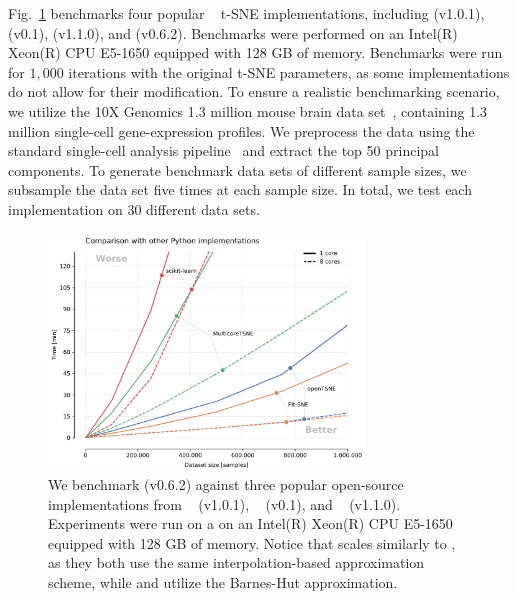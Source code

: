 \documentclass[article]{jss}
\newcommand{\opentsne}{\pkg{openTSNE}\xspace}
\begin{document}
Fig.~\ref{fig:benchmarks_py} benchmarks four popular ~\citep{vanrossum1995python} t-SNE implementations, including  (v1.0.1),  (v0.1),  (v1.1.0), and \opentsne (v0.6.2). Benchmarks were performed on an Intel(R) Xeon(R) CPU E5-1650 equipped with 128 GB of memory. Benchmarks were run for $1,000$ iterations with the original t-SNE parameters, as some implementations do not allow for their modification. To ensure a realistic benchmarking scenario, we utilize the 10X Genomics 1.3 million mouse brain data set~\citep{xxx}, containing 1.3 million single-cell gene-expression profiles. We preprocess the data using the standard single-cell analysis pipeline~\citep{xxx} and extract the top 50 principal components. To generate benchmark data sets of different sample sizes, we subsample the data set five times at each sample size. In total, we test each implementation on 30 different data sets.

\begin{figure}[ht]
  \centering
  \includegraphics[width=0.75\textwidth]{benchmarks_python-final}
  \caption{\label{fig:benchmarks_py}
  We benchmark \opentsne (v0.6.2) against three popular open-source
  implementations from ~\citep{pedregosa2011scikit}
  (v1.0.1), ~\citep{Ulyanov2016} (v0.1), and
  ~\citep{linderman2019fast} (v1.1.0). Experiments were run on a
  on an Intel(R) Xeon(R) CPU E5-1650 equipped with 128 GB of memory. Notice
  that \opentsne scales similarly to , as they both use the
  same interpolation-based approximation scheme, while  and
   utilize the Barnes-Hut approximation.
}
\end{figure}
\end{document}
